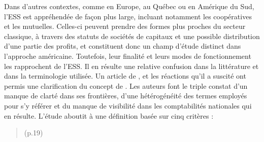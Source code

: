             Dans d’autres contextes, comme en Europe, au Québec ou en Amérique du Sud, l’ESS est appréhendée de façon plus large, incluant notamment les coopératives et les mutuelles. Celles-ci peuvent prendre des formes plus proches du secteur classique, à travers des statuts de sociétés de capitaux et une possible distribution d’une partie des profits, et constituent donc un champ d’étude distinct dans l’approche américaine. Toutefois, leur finalité et leurs modes de fonctionnement les rapprochent de l’ESS. Il en résulte une relative confusion dans la littérature et dans la terminologie utilisée. Un article de \textcite{salamon2016beyond}, et les réactions qu’il a suscité \parencite{defourny2016voluntas} ont permis une clarification du concept de . Les auteurs font le triple constat d’un manque de clarté dans ses frontières, d’une hétérogénéité des termes employés pour s’y référer et du manque de visibilité dans les comptabilités nationales qui en résulte. L’étude aboutit à une définition basée sur cinq critères :
            \begin{quotation}
                 (p.19)
            \end{quotation}



